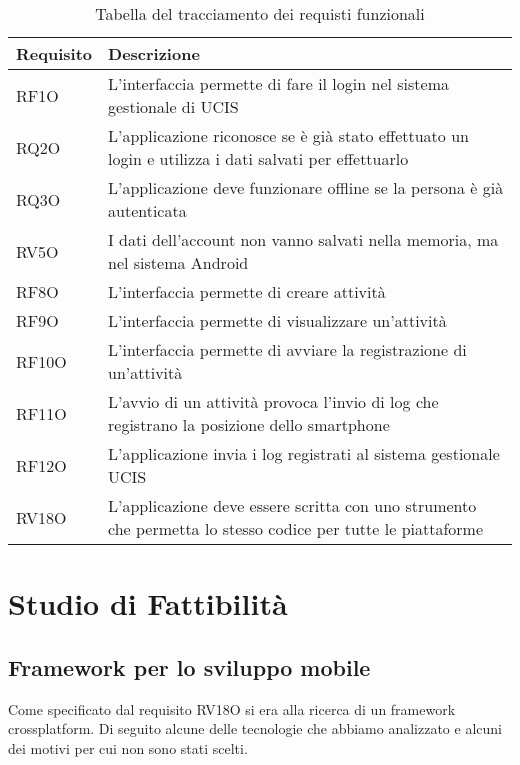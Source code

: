 \renewcommand{\arraystretch}{2}
\begin{longtable}{|p{4cm}|p{10cm}|}%
  \caption{Tabella del tracciamento dei requisti funzionali} 
  \label{tab:requisiti} \\
  
    \hline
    \textbf{Requisito} & \textbf{Descrizione} \\
    \hline
    \endhead
    RF1O     & L'interfaccia permette di fare il login nel sistema gestionale di UCIS \\ \hline
    RQ2O     & L'applicazione riconosce se è già stato effettuato un login e utilizza i dati salvati per effettuarlo \\ \hline
    RQ3O     & L'applicazione deve funzionare offline se la persona è già autenticata \\ \hline
    RV5O     & I dati dell'account non vanno salvati nella memoria, ma nel sistema Android \\ \hline
    RF8O     & L'interfaccia permette di creare attività \\ \hline
    RF9O     & L'interfaccia permette di visualizzare un'attività \\ \hline
    RF10O     & L'interfaccia permette di avviare la registrazione di un'attività \\ \hline
    RF11O     & L'avvio di un attività provoca l'invio di log che registrano la posizione dello smartphone \\ \hline
    RF12O     & L'applicazione invia i log registrati al sistema gestionale UCIS \\ \hline
    RV18O     & L'applicazione deve essere scritta con uno strumento che permetta lo stesso codice per tutte le piattaforme \\ \hline
\end{longtable}%


\section{Studio di Fattibilità}
\label{sec:studiodifattibilita}
\subsection{Framework per lo sviluppo mobile}
Come specificato dal requisito RV18O si era alla ricerca di un framework crossplatform. Di seguito alcune delle tecnologie che abbiamo analizzato e alcuni dei motivi per
cui non sono stati scelti.

